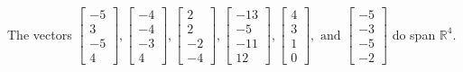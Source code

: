 \begin{exercise}
\begin{exerciseStatement}
  \end{exerciseStatement}
  \begin{exerciseAnswer}
   The vectors \(\left[\begin{array}{r}
-5 \\
3 \\
-5 \\
4
\end{array}\right] , \left[\begin{array}{r}
-4 \\
-4 \\
-3 \\
4
\end{array}\right] , \left[\begin{array}{r}
2 \\
2 \\
-2 \\
-4
\end{array}\right] , \left[\begin{array}{r}
-13 \\
-5 \\
-11 \\
12
\end{array}\right] , \left[\begin{array}{r}
4 \\
3 \\
1 \\
0
\end{array}\right] , \text{ and } \left[\begin{array}{r}
-5 \\
-3 \\
-5 \\
-2
\end{array}\right]\) 
  	 do  
	span \(\mathbb{R}^4\).
  


  \end{exerciseAnswer}
\end{exercise}